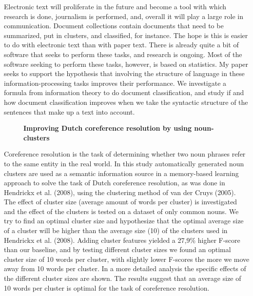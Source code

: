 \documentclass[10pt, a4paper, twopage, headinclude, footinclude, BCOR5mm]{scrartcl}
\begin{document}
\noindent
Electronic text will proliferate in the future and become a tool with which research is done, journalism is performed, and, overall it will play a large role in communication.  Document collections contain documents that need to be summarized, put in clusters, and classified, for instance. The hope is this is easier to do with electronic text than with paper text.  There is already quite a bit of software that seeks to perform these tasks, and research is ongoing.  Most of the software seeking to perform these tasks, however, is based on statistics.  My paper seeks to support the hypothesis that involving the structure of language in these information-processing tasks improves their performance. We investigate a formula from information theory to do document classification, and study if and how document classification improves when we take the syntactic structure of the sentences that make up a text into account.


\newpage

\begin{figure}[t!]
\centering
\large\textbf{Improving Dutch coreference resolution by using noun-clusters}
\vspace*{0.5cm}
\end{figure}


        \begin{table}[t!]
    \end{table}

\noindent
Coreference resolution is the task of determining whether two noun phrases refer to the same entity in the real world. In this study automatically generated noun clusters are used as a semantic information source in a memory-based learning approach to solve the task of Dutch coreference resolution, as was done in Hendrickx et al. (2008), using the clustering method of van der Cruys (2005). The effect of cluster size (average amount of words per cluster) is investigated and the effect of the clusters is tested on a dataset of only common nouns. We try to find an optimal cluster size and hypothesize that the optimal average size of a cluster will be higher than the average size (10) of the clusters used in Hendrickx et al. (2008). Adding cluster features yielded a 27,9\% higher F-score than our baseline, and by testing different cluster sizes we found an optimal cluster size of 10 words per cluster, with slightly lower F-scores the more we move away from 10 words per cluster. In a more detailed analysis the specific effects of the different cluster sizes are shown. The results suggest that an average size of 10 words per cluster is optimal for the task of coreference resolution.
\end{document}
